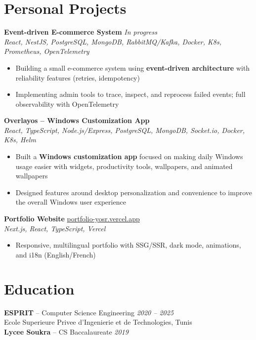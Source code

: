 \documentclass[10pt,a4paper]{article}
\begin{document}
\section*{Personal Projects}
{\small

\textbf{Event-driven E-commerce System} \hfill \textit{In progress}\\[1pt]
\textit{React, NestJS, PostgreSQL, MongoDB, RabbitMQ/Kafka, Docker, K8s, Prometheus, OpenTelemetry}
\begin{itemize}
  \item Building a small e-commerce system using \textbf{event-driven architecture} with reliability features (retries, idempotency)
  \item Implementing admin tools to trace, inspect, and reprocess failed events; full observability with OpenTelemetry
\end{itemize}

\vspace{3pt}
\textbf{Overlayos -- Windows Customization App} \\[1pt]
\textit{React, TypeScript, Node.js/Express, PostgreSQL, MongoDB, Socket.io, Docker, K8s, Helm}
\begin{itemize}
  \item Built a \textbf{Windows customization app} focused on making daily Windows usage easier with widgets, productivity tools, wallpapers, and animated wallpapers
  \item Designed features around desktop personalization and convenience to improve the overall Windows user experience
\end{itemize}

\vspace{3pt}
\textbf{Portfolio Website} \hfill \href{https://portfolio-yosr.vercel.app/en}{portfolio-yosr.vercel.app}\\[1pt]
\textit{Next.js, React, TypeScript, Vercel}
\begin{itemize}
  \item Responsive, multilingual portfolio with SSG/SSR, dark mode, animations, and i18n (English/French)
\end{itemize}

}

\section*{Education}
{\small
\textbf{ESPRIT} -- Computer Science Engineering \hfill \textit{2020 -- 2025}\\[1pt]
Ecole Superieure Privee d'Ingenierie et de Technologies, Tunis\\[3pt]
\textbf{Lycee Soukra} -- CS Baccalaureate \hfill \textit{2019}
}
\end{document}
